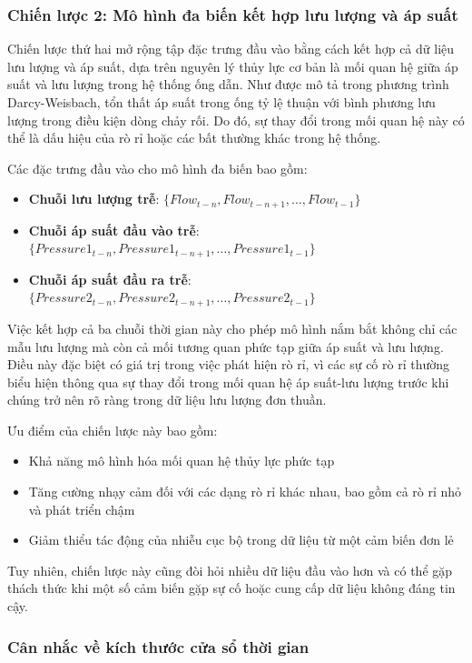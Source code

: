 \subsubsection{Chiến lược 2: Mô hình đa biến kết hợp lưu lượng và áp suất}

Chiến lược thứ hai mở rộng tập đặc trưng đầu vào bằng cách kết hợp cả dữ liệu lưu lượng và áp suất, dựa trên nguyên lý thủy lực cơ bản là mối quan hệ giữa áp suất và lưu lượng trong hệ thống ống dẫn. Như được mô tả trong phương trình Darcy-Weisbach, tổn thất áp suất trong ống tỷ lệ thuận với bình phương lưu lượng trong điều kiện dòng chảy rối. Do đó, sự thay đổi trong mối quan hệ này có thể là dấu hiệu của rò rỉ hoặc các bất thường khác trong hệ thống.

Các đặc trưng đầu vào cho mô hình đa biến bao gồm:
\begin{itemize}
    \item \textbf{Chuỗi lưu lượng trễ}: $\{Flow_{t-n}, Flow_{t-n+1}, \ldots, Flow_{t-1}\}$
    \item \textbf{Chuỗi áp suất đầu vào trễ}: $\{Pressure1_{t-n}, Pressure1_{t-n+1}, \ldots, Pressure1_{t-1}\}$
    \item \textbf{Chuỗi áp suất đầu ra trễ}: $\{Pressure2_{t-n}, Pressure2_{t-n+1}, \ldots, Pressure2_{t-1}\}$
\end{itemize}

Việc kết hợp cả ba chuỗi thời gian này cho phép mô hình nắm bắt không chỉ các mẫu lưu lượng mà còn cả mối tương quan phức tạp giữa áp suất và lưu lượng. Điều này đặc biệt có giá trị trong việc phát hiện rò rỉ, vì các sự cố rò rỉ thường biểu hiện thông qua sự thay đổi trong mối quan hệ áp suất-lưu lượng trước khi chúng trở nên rõ ràng trong dữ liệu lưu lượng đơn thuần.

Ưu điểm của chiến lược này bao gồm:
\begin{itemize}
    \item Khả năng mô hình hóa mối quan hệ thủy lực phức tạp
    \item Tăng cường nhạy cảm đối với các dạng rò rỉ khác nhau, bao gồm cả rò rỉ nhỏ và phát triển chậm
    \item Giảm thiểu tác động của nhiễu cục bộ trong dữ liệu từ một cảm biến đơn lẻ
\end{itemize}

Tuy nhiên, chiến lược này cũng đòi hỏi nhiều dữ liệu đầu vào hơn và có thể gặp thách thức khi một số cảm biến gặp sự cố hoặc cung cấp dữ liệu không đáng tin cậy.

\subsubsection{Cân nhắc về kích thước cửa sổ thời gian}

